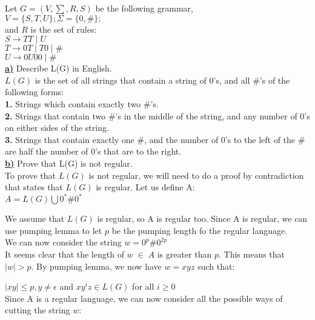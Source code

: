\documentclass[12pt]{article}
\begin{document}
 Let $G = (V, \sum, R, S)$ be the following grammar, \\
$V = \{S, T, U\}; Σ = \{0, \#\};$ \\

and $R$ is the set of rules: \\
$S \rightarrow TT \; | \; U$ \\
$T \rightarrow 0T \; | \; T 0 \; | \; \#$ \\
$U \rightarrow 0U 00 \; | \; \#$ \\

\underline{\textbf{a)}} Describe L(G) in English. \\

$L(G)$ is the set of all strings that contain a string of 0's, and all \#'s of the
following forms: \\

\textbf{1.} Strings which contain exactly two \#'s. \\
\textbf{2.} Strings that contain two \#'s in the middle of the string, and any number of 0's
on either sides of the string. \\
\textbf{3.} Strings that contain exactly one \#, and the number of 0's to the left of the \#
are half the number of 0's that are to the right. \\

\underline{\textbf{b)}} Prove that L(G) is not regular. \\

To prove that $L(G)$ is not regular, we will need to do a proof by contradiction that
states that $L(G)$ is regular. Let us define A: \\

$A = L(G) \bigcup 0^* \# 0^*$

We assume that $L(G)$ is regular, so A is regular too. Since A is regular, we can use
pumping lemma to let $p$ be the pumping length fo the regular language. \\

We can now consider the string $w = 0^p \# 0^{2p} $ \\
It seems clear that the length of $w \; \in \; A$ is greater than $p$. This means
that $|w| > p$. By pumping lemma, we now have $w = xyz$ such that:

$|xy| \le p, y \neq \epsilon $ and $xy^iz \in L(G)$ for all $i \geq 0$ \\

\pagebreak
Since A is a regular language, we can now consider all the possible ways of cutting
the string $w$: \\
\end{document}
